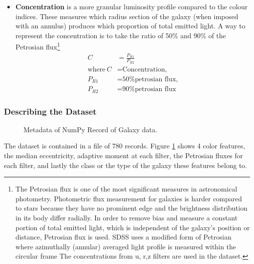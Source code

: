 \begin{itemize}
	\item \textbf{Concentration} is a more granular luminosity profile compared to the colour indices. These measures which radius section of the galaxy (when imposed with an annulus) produces which proportion of total emitted light. A way to represent the concentration is to take the ratio of 50\% and 90\% of the Petrosian flux\footnote{The Petrosian flux is one of the most significant measures in astronomical photometry. Photometric flux measurement for galaxies is harder compared to stars because they have no prominent edge and the brightness distribution in its body differ radially. In order to remove bias and measure a constant portion of total emitted light, which is independent of the galaxy's position or distance, Petrosian flux is used. SDSS uses a modified form of Petrosian where  azimuthally (annular) averaged light profile is measured within the circular frame \parencite{sloan_digital_sky_survey_measures_2019} The concentrations from u, r,z filters are used in the dataset.}
	\begin{align*}
		C &= \frac{P_{R1}}{P_{R2}}\\
		\text{where}~C &= \text{Concentration,}\\
		P_{R1} &= \text{50\% petrosian flux,}\\
		P_{R2} &= \text{90\% petrosian flux}
	\end{align*}
\end{itemize}

\subsubsection{Describing the Dataset}
\begin{figure}[H]
	\centering
	\caption{Metadata of NumPy Record of Galaxy data.}
	\label{fig:dts}
\end{figure}
The dataset is contained in a  file of 780 records. Figure \ref{fig:dts} shows 4 color features, the median eccentricity, adaptive moment at each filter, the Petrosian fluxes for each filter, and lastly the class or the type of the galaxy these features belong to.

